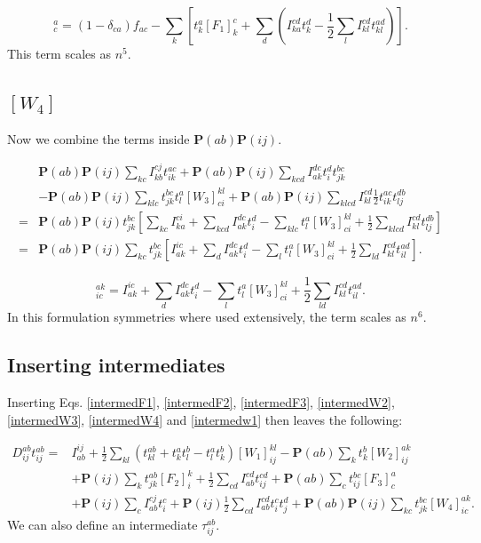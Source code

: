 \documentclass[a4paper,norsk,11pt,twoside]{report}
\begin{document}
\begin{equation}
[F_3]_c^a = (1-\delta_{ca}) f_{ac}
- \sum_{k} \left[ t_k^a [F_1]_k^c
+ \sum_{d} \left( I_{ka}^{cd} t_k^d 
- \frac{1}{2} \sum_{l} I_{kl}^{cd} t_{kl}^{ad} \right) \right] . \label{intermedF3}
\end{equation}
This term scales as $n^5$.

\subsection{$[W_4]$}
Now we combine the terms inside $\textbf{P}(ab) \textbf{P}(ij)$. 

\begin{align}
& \textbf{P}(ab) \textbf{P}(ij) \sum_{kc} I_{kb}^{cj} t_{ik}^{ac}
+ \textbf{P}(ab) \textbf{P}(ij) \sum_{kcd} I_{ak}^{dc} t_i^d t_{jk}^{bc}
\nonumber \\ &
- \textbf{P}(ab) \textbf{P}(ij) \sum_{klc} t_{jk}^{bc} t_l^a [W_3]_{ci}^{kl}
+ \textbf{P}(ab) \textbf{P}(ij) \sum_{klcd} I_{kl}^{cd} \frac{1}{2} t_{ik}^{ac} t_{lj}^{db}
\nonumber \\
= & \textbf{P}(ab) \textbf{P}(ij) t^{bc}_{jk} \left[
\sum_{kc} I_{ka}^{ci} 
+ \sum_{kcd} I_{ak}^{dc} t_i^d
- \sum_{klc} t_l^a [W_3]_{ci}^{kl}
+ \frac{1}{2} \sum_{klcd} I_{kl}^{cd} t_{lj}^{db}
\right] \nonumber \\ 
= &
\textbf{P}(ab) \textbf{P}(ij)  \sum_{kc} t^{bc}_{jk} \left[
I_{ak}^{ic} 
+ \sum_{d} I_{ak}^{dc} t_i^d
- \sum_{l} t_l^a [W_3]_{ci}^{kl}
+ \frac{1}{2} \sum_{ld} I_{kl}^{cd} t_{il}^{ad}
\right] .
\end{align}

\begin{equation}
[W_4]_{ic}^{ak} = 
I_{ak}^{ic} 
+ \sum_{d} I_{ak}^{dc} t_i^d
- \sum_{l} t_l^a [W_3]_{ci}^{kl}
+ \frac{1}{2} \sum_{ld} I_{kl}^{cd} t_{il}^{ad} .
\label{intermedW4}
\end{equation}
In this formulation symmetries where used extensively, the term scales as $n^6$.

\subsection{Inserting intermediates}
Inserting Eqs. \eqref{intermedF1}, \eqref{intermedF2}, \eqref{intermedF3}, \eqref{intermedW2}, \eqref{intermedW3}, \eqref{intermedW4} and \eqref{intermedw1} then leaves the following:

\begin{align}
D_{ij}^{ab} t_{ij}^{ab} = & 
I_{ab}^{ij} +
\frac{1}{2} \sum_{kl} (t_{kl}^{ab} + t_k^a t_l^b - t_l^a t_k^b) [W_1]_{ij}^{kl}
- \textbf{P}(ab) \sum_k t_k^b [W_2]_{ij}^{ak}
\nonumber \\ &
+ \textbf{P}(ij) \sum_k t_{jk}^{ab} [F_2]_i^k
+ \frac{1}{2} \sum_{cd} I_{ab}^{cd} t_{ij}^{cd}
+ \textbf{P}(ab) \sum_c t_{ij}^{bc} [F_3]_c^a
\nonumber \\ &
+ \textbf{P}(ij) \sum_c I_{ab}^{cj} t_i^c
+ \textbf{P}(ij) \frac{1}{2} \sum_{cd} I_{ab}^{cd} t_i^c t_j^d 
+ \textbf{P}(ab) \textbf{P}(ij) \sum_{kc} t_{jk}^{bc} [W_4]_{ic}^{ak} .
\end{align}
We can also define an intermediate $\tau_{ij}^{ab}$.
\end{document}
